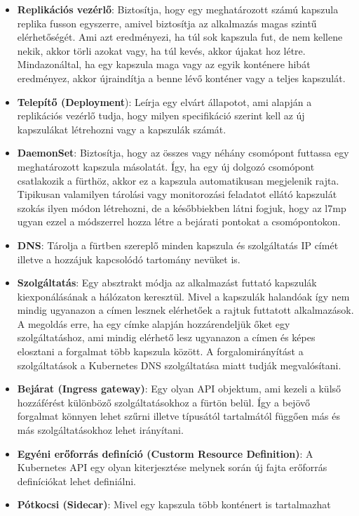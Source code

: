 \begin{itemize}
	\item \textbf{Replikációs vezérlő}: Biztosítja, hogy egy meghatározott számú 
	kapszula replika fusson egyszerre, amivel biztosítja az alkalmazás magas szintű
	elérhetőségét. Ami azt eredményezi, ha túl sok kapszula fut, de nem kellene nekik,
	akkor törli azokat vagy, ha túl kevés, akkor újakat hoz létre. Mindazonáltal, 
	ha egy kapszula maga vagy az egyik konténere hibát eredményez, akkor újraindítja
	a benne lévő konténer vagy a teljes kapszulát. 
	\item \textbf{Telepítő (Deployment}): Leírja egy elvárt állapotot, ami alapján a
	replikációs vezérlő tudja, hogy milyen specifikáció szerint kell az új kapszulákat
	létrehozni vagy a kapszulák számát. 
	\item \textbf{DaemonSet}: Biztosítja, hogy az összes vagy néhány csomópont 
	futtassa egy meghatározott kapszula másolatát. Így, ha egy új dolgozó csomópont 
	csatlakozik a fürthöz, akkor ez a kapszula automatikusan megjelenik rajta. Tipikusan
	valamilyen tárolási vagy monitorozási feladatot ellátó kapszulát szokás ilyen
	módon létrehozni, de a későbbiekben látni fogjuk, hogy az l7mp ugyan ezzel a 
	módszerrel hozza létre a bejárati pontokat a csomópontokon.
	\item \textbf{DNS}: Tárolja a fürtben szereplő minden kapszula és szolgáltatás
	IP címét illetve a hozzájuk kapcsolódó tartomány nevüket is.  
	\item \textbf{Szolgáltatás}: Egy absztrakt módja az alkalmazást futtató kapszulák
	kiexponálásának a hálózaton keresztül. Mivel a kapszulák halandóak így nem mindig
	ugyanazon a címen lesznek elérhetőek a rajtuk futtatott alkalmazások. A megoldás
	erre, ha egy címke alapján hozzárendeljük őket egy szolgáltatáshoz, ami mindig 
	elérhető lesz ugyanazon a címen és képes elosztani a forgalmat több kapszula között.
	A forgalomirányítást a szolgáltatások a Kubernetes DNS szolgáltatása miatt tudják 
	megvalósítani.  
	\item \textbf{Bejárat (Ingress gateway)}: Egy olyan API objektum, ami kezeli a 
	külső hozzáférést különböző szolgáltatásokhoz a fürtön belül. Így a bejövő forgalmat
	könnyen lehet szűrni illetve típusától tartalmától függően más és más szolgáltatásokhoz
	lehet irányítani. 
	\item \textbf{Egyéni erőforrás definíció (Custorm Resource Definition)}: A 
	Kubernetes API egy olyan kiterjesztése melynek során új fajta erőforrás definíciókat
	lehet definiálni. 
	\item \textbf{Pótkocsi (Sidecar)}: Mivel egy kapszula több konténert is tartalmazhat

\end{itemize}
